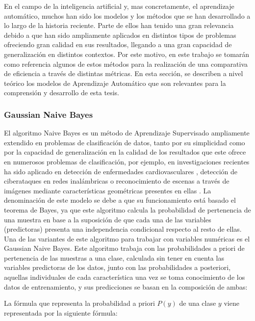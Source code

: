 \documentclass{uathesis-es}
\begin{document}

En el campo de la inteligencia artificial y, mas concretamente, el aprendizaje automático, muchos han sido los modelos y los métodos que se han desarrollado a lo largo de la historia reciente. Parte de ellos han tenido una gran relevancia debido a que han sido ampliamente aplicados en distintos tipos de problemas ofreciendo gran calidad en sus resultados, llegando a una gran capacidad de generalización en distintos contextos. Por este motivo, en este trabajo se tomarán como referencia algunos de estos métodos para la realización de una comparativa de eficiencia a través de distintas métricas. En esta sección, se describen a nivel teórico los modelos de Aprendizaje Automático que son relevantes para la comprensión y desarrollo de esta tesis. 


\subsubsection*{Gaussian Naive Bayes}


El algoritmo Naive Bayes es un método de Aprendizaje Supervisado ampliamente extendido en problemas de clasificación de datos, tanto por su simplicidad como por la capacidad de generalización en la calidad de los resultados que este ofrece en numerosos problemas de clasificación, por ejemplo, en investigaciones recientes ha sido aplicado en detección de enfermedades cardiovasculares \cite{Sai_Krishna_Reddy_2022}, detección de ciberataques en redes inalámbricas \cite{9817298} o reconocimiento de escenas a través de imágenes mediante características geométricas presentes en ellas \cite{rafique2019scene}. La denominación de este modelo se debe a que su funcionamiento está basado el teorema de Bayes, ya que este algoritmo calcula la probabilidad de pertenencia de una muestra en base a la suposición de que cada una de las variables (predictoras) presenta una independencia condicional respecto al resto de ellas. Una de las variantes de este algoritmo para trabajar con variables numéricas es el Gaussian Naive Bayes. Este algoritmo trabaja con las probabilidades a priori de pertenencia de las muestras a una clase, calculada sin tener en cuenta las variables predictoras de los datos, junto con las probabilidades a posteriori, aquellas individuales de cada característica una vez se toma conocimiento de los datos de entrenamiento, y sus predicciones se basan en la composición de ambas:

La fórmula que representa la probabilidad a priori $P(y)$ de una clase $y$ viene representada por la siguiente fórmula:\\
\end{document}
